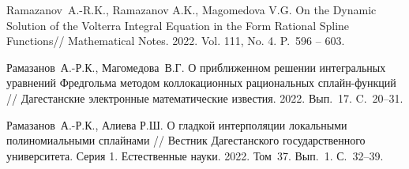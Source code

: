 \begin{thebibliography}{111}
 Ramazanov~A.-R.K., Ramazanov A.K., Magomedova V.G.
On the Dynamic Solution of the Volterra Integral Equation in the Form
Rational Spline Functions// Mathematical Notes. 2022. Vol. 111, No. 4.
P.~596 – 603.

 Рамазанов~А.-Р.К., Магомедова~В.Г.
 О приближенном решении интегральных уравнений Фредгольма методом
коллокационных рациональных сплайн-функций //
Дагестанские электронные математические известия. 2022. Вып.~17. C.~20--31.

 Рамазанов~А.-Р.К., Алиева Р.Ш. О гладкой интерполяции
 локальными полиномиальными сплайнами // Вестник Дагестанского
государственного университета. Серия 1. Естественные науки. 2022. Том~37.
 Вып.~1. С.~32--39.

\end{thebibliography} 